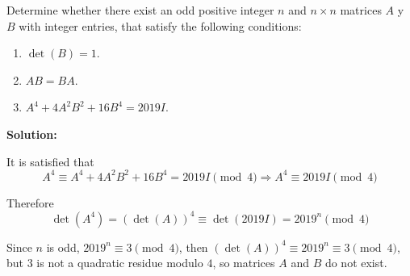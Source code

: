 \documentclass[../../main.tex]{subfiles}
\begin{document}
  \begin{shaded}
    Determine whether there exist an odd positive integer $n$ and $n \times n$ matrices $A$ y $B$ with integer entries, that satisfy the following conditions:

    \begin{enumerate}[1.]
      \item $\det{(B)} = 1$.
      \item $A B = B A$.
      \item $A^4 + 4 A^2 B^2 + 16 B^4 = 2019 I$.
    \end{enumerate}
  \end{shaded}

  \textbf{Solution:}

  It is satisfied that
  $$
  A^4 \equiv A^4 + 4 A^2 B^2 + 16 B^4 = 2019 I \pmod{4} \Longrightarrow A^4 \equiv 2019 I \pmod{4}
  $$

  Therefore
  $$
  \det{(A^4)} = \left(\det{(A)}\right)^4 \equiv \det{(2019 I)} = 2019^n \pmod{4}
  $$

  Since $n$ is odd, $2019^n \equiv 3 \pmod{4}$, then $\left(\det{(A)}\right)^4 \equiv  2019^n \equiv 3 \pmod{4}$, but $3$ is not a quadratic residue modulo $4$, so matrices $A$ and $B$ do not exist.
\end{document}
